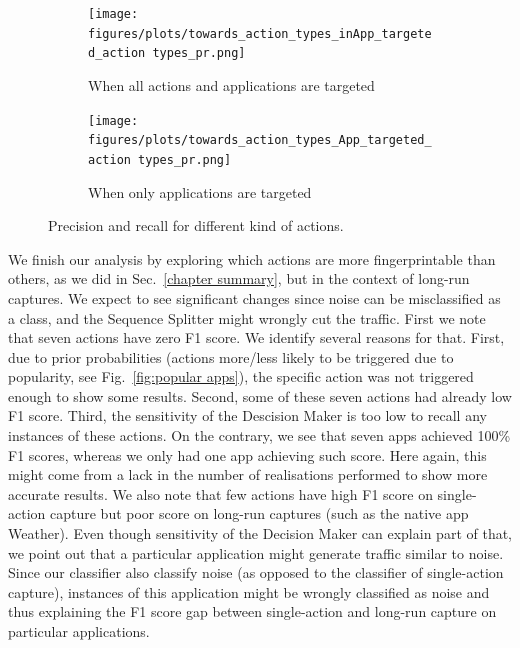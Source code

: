 \begin{figure}[H]
\centering
\begin{subfigure}{.5\textwidth}
  \centering
  \texttt{[image: figures/plots/towards\_action\_types\_inApp\_targeted\_action types\_pr.png]}
  \caption{When all actions and applications are targeted}
  \label{towards_action_types_pr}
\end{subfigure}%
\begin{subfigure}{.5\textwidth}
  \centering
  \texttt{[image: figures/plots/towards\_action\_types\_App\_targeted\_action types\_pr.png]}
  \caption{When only applications are targeted}
  \label{fig:When only application are targeted}
\end{subfigure}
 \caption{Precision and recall for different kind of actions.}
  \label{fig:towards_action_types_pr}
\end{figure}


 

 We finish our analysis by exploring which actions are more fingerprintable than others, as we did in Sec.~\ref{chapter summary}, but in the context of long-run captures. We expect to see significant changes since noise can be misclassified as a class, and the Sequence Splitter might wrongly cut the traffic. First we note that seven actions have zero F1 score. We identify several reasons for that. First, due to prior probabilities (actions more/less likely to be triggered due to popularity, see Fig.~\ref{fig:popular apps}), the specific action was not triggered enough to show some results. Second, some of these seven actions had already low F1 score. Third, the sensitivity of the Descision Maker is too low to recall any instances of these actions. On the contrary, we see that seven apps achieved 100\% F1 scores, whereas we only had one app achieving such score. Here again, this might come from a lack in the number of realisations performed to show more accurate results. We also note that few actions have high F1 score on single-action capture but poor score on long-run captures (such as the native app Weather). Even though sensitivity of the Decision Maker can explain part of that, we point out that a particular application might generate traffic similar to noise. Since our classifier also classify noise (as opposed to the classifier of single-action capture), instances of this application might be wrongly classified as noise and thus explaining the F1 score gap between single-action and long-run capture on particular applications. 
 \\
 
